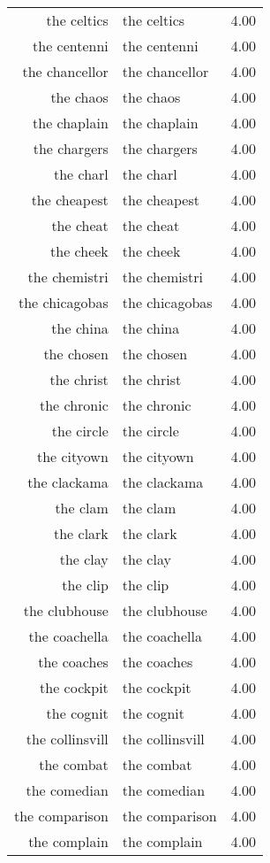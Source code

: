 \begin{table}[ht]
\begin{tabular}{rlr}
  the celtics & the celtics & 4.00 \\ 
  the centenni & the centenni & 4.00 \\ 
  the chancellor & the chancellor & 4.00 \\ 
  the chaos & the chaos & 4.00 \\ 
  the chaplain & the chaplain & 4.00 \\ 
  the chargers & the chargers & 4.00 \\ 
  the charl & the charl & 4.00 \\ 
  the cheapest & the cheapest & 4.00 \\ 
  the cheat & the cheat & 4.00 \\ 
  the cheek & the cheek & 4.00 \\ 
  the chemistri & the chemistri & 4.00 \\ 
  the chicagobas & the chicagobas & 4.00 \\ 
  the china & the china & 4.00 \\ 
  the chosen & the chosen & 4.00 \\ 
  the christ & the christ & 4.00 \\ 
  the chronic & the chronic & 4.00 \\ 
  the circle & the circle & 4.00 \\ 
  the cityown & the cityown & 4.00 \\ 
  the clackama & the clackama & 4.00 \\ 
  the clam & the clam & 4.00 \\ 
  the clark & the clark & 4.00 \\ 
  the clay & the clay & 4.00 \\ 
  the clip & the clip & 4.00 \\ 
  the clubhouse & the clubhouse & 4.00 \\ 
  the coachella & the coachella & 4.00 \\ 
  the coaches & the coaches & 4.00 \\ 
  the cockpit & the cockpit & 4.00 \\ 
  the cognit & the cognit & 4.00 \\ 
  the collinsvill & the collinsvill & 4.00 \\ 
  the combat & the combat & 4.00 \\ 
  the comedian & the comedian & 4.00 \\ 
  the comparison & the comparison & 4.00 \\ 
  the complain & the complain & 4.00 \\ 

\end{tabular}
\end{table}
